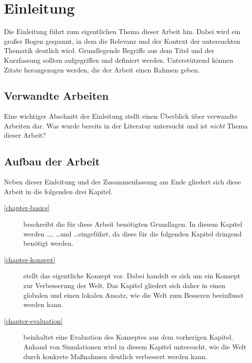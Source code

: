 
\chapter{Einleitung}

Die Einleitung führt zum eigentlichen Thema dieser Arbeit hin. Dabei wird ein großer Bogen gespannt, in dem die Relevanz und der Kontext der untersuchten Thematik deutlich wird. Grundlegende Begriffe aus dem Titel und der Kurzfassung sollten aufgegriffen und definiert werden. Unterstützend können Zitate herangezogen werden, die der Arbeit einen Rahmen geben.

\section{Verwandte Arbeiten}

Eine wichtiger Abschnitt der Einleitung stellt einen Überblick über verwandte Arbeiten dar. Was wurde bereits in der Literatur untersucht und ist \emph{nicht} Thema dieser Arbeit?

\section{Aufbau der Arbeit}

Neben dieser Einleitung und der Zusammenfassung am Ende gliedert sich diese Arbeit in die folgenden drei Kapitel.
\begin{description}
  \item[\ref{chapter-basics}] beschreibt die für diese Arbeit benötigten Grundlagen. In diesem Kapitel werden \ldots, \ldots und \ldots eingeführt, da diese für die folgenden Kapitel dringend benötigt werden.
  \item[\ref{chapter-konzept}] stellt das eigentliche Konzept vor. Dabei handelt es sich um ein Konzept zur Verbesserung der Welt. Das Kapitel gliedert sich daher in einen globalen und einen lokalen Ansatz, wie die Welt zum Besseren beeinflusst werden kann.
  \item[\ref{chapter-evaluation}] beinhaltet eine Evaluation des Konzeptes aus dem vorherigen Kapitel. Anhand von Simulationen wird in diesem Kapitel untersucht, wie die Welt durch konkrete Maßnahmen deutlich verbessert werden kann.
\end{description}

